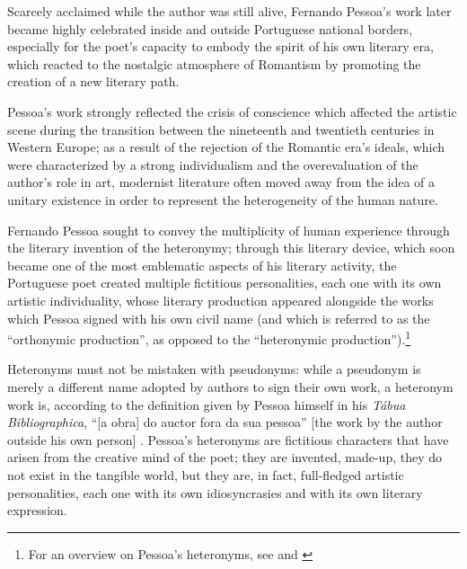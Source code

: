 \documentclass{article}
\begin{document}
Scarcely acclaimed while the author was still alive, Fernando Pessoa's
work later became highly celebrated inside and outside Portuguese
national borders, especially for the poet's capacity to embody the
spirit of his own literary era, which reacted to the nostalgic
atmosphere of Romantism by promoting the creation of a new literary
path.

Pessoa's work strongly reflected the crisis of conscience which affected
the artistic scene during the transition between the nineteenth and
twentieth centuries in Western Europe; as a result of the rejection of
the Romantic era's ideals, which were characterized by a strong
individualism and the overevaluation of the author's role in art,
modernist literature often moved away from the idea of a unitary
existence in order to represent the heterogeneity of the human nature.

Fernando Pessoa sought to convey the multiplicity of human experience 
through the literary invention of the heteronymy; through this
literary device, which soon became one of the most emblematic aspects of
his literary activity, the Portuguese poet created multiple fictitious
personalities, each one with its own artistic individuality, whose
literary production appeared alongside the works which Pessoa
signed with his own civil name (and which is referred to as the
``orthonymic production'', as opposed to the ``heteronymic
production'').\footnote{For an overview on Pessoa's heteronyms, see \cite{zenith_pessoa_2021} and \cite{pessoa_eu_2013}}

Heteronyms must not be mistaken with pseudonyms: while a pseudonym is
merely a different name adopted by authors to sign their own work, a
heteronym work is, according to the definition given by Pessoa himself
in his \emph{Tábua Bibliographica}, ``[a obra] do auctor fora da sua
pessoa'' [the work by the author outside his own person]
\parencite{pessoa_tabua_1928}. Pessoa's heteronyms are fictitious characters that have arisen from the
creative mind of the poet; they are invented, made-up, they do not exist
in the tangible world, but they are, in fact, full-fledged artistic
personalities, each one with its own idiosyncrasies and with its own
literary expression.
\end{document}
